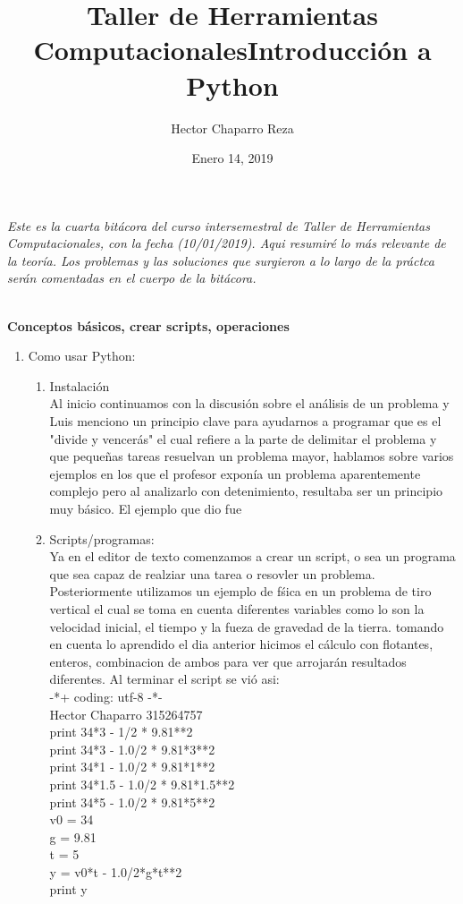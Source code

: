 \documentclass[letterpaper, 12pt, oneside]{article}
\title{\Huge{Taller de Herramientas Computacionales}}
\author{Hector Chaparro Reza}
\date{Enero 14, 2019}
\begin{document}
	\maketitle
	\it Este es la cuarta bit\'acora del curso intersemestral de Taller de Herramientas Computacionales, con la fecha (10/01/2019). Aqui resumir\'e lo m\'as relevante de la teor\'ia. Los problemas y las soluciones que surgieron a lo largo de la pr\'actca ser\'an comentadas en el cuerpo de la bit\'acora. 
	\newpage
	
	\title{\Huge{Introducci\'on a Python}}\\
	
	\textbf{Conceptos b\'asicos, crear scripts, operaciones}\\
	
	\begin{enumerate}
		\item {Como usar Python:}
		\begin{enumerate}
			\item Instalaci\'on\\
			Al inicio continuamos con la discusi\'on sobre el an\'alisis de un problema y Luis menciono un principio clave para ayudarnos a programar que es el "divide y vencer\'as" el cual refiere a la parte de delimitar el problema y que pequeñas tareas resuelvan un problema mayor, hablamos sobre varios ejemplos en los que el profesor expon\'ia un problema aparentemente complejo pero al analizarlo con detenimiento, resultaba ser un principio muy b\'asico. El ejemplo que dio fue\\
			
			\item Scripts/programas:\\
			Ya en el editor de texto comenzamos a crear un script, o sea un programa que sea capaz de realziar una tarea o resovler un problema.  Posteriormente utilizamos un ejemplo de f\'sica en un problema de tiro vertical el cual se toma en cuenta diferentes variables como lo son la velocidad inicial, el tiempo y la fueza de gravedad de la tierra. tomando en cuenta lo aprendido el dia anterior hicimos el c\'alculo con flotantes, enteros, combinacion de ambos para ver que arrojar\'an resultados diferentes. Al terminar el script se vi\'o asi:\\
			
			-*+ coding: utf-8 -*-\\
			Hector Chaparro 315264757\\
			print 34*3 - 1/2 * 9.81**2\\
			print 34*3 - 1.0/2 * 9.81*3**2\\
			print 34*1 - 1.0/2 * 9.81*1**2\\
			print 34*1.5 - 1.0/2 * 9.81*1.5**2\\
			print 34*5 - 1.0/2 * 9.81*5**2\\
			v0 = 34\\
			g = 9.81\\
			t = 5\\
			y = v0*t - 1.0/2*g*t**2\\
			print y\\
			

\end{enumerate}
\end{enumerate}
\end{document}
